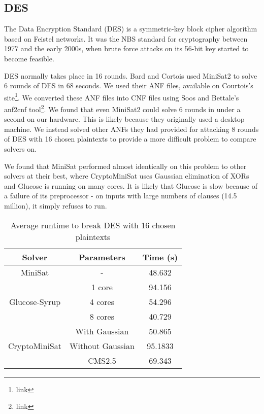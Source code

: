 \subsection{DES}
\label{sec:encoding:des}

The Data Encryption Standard (DES) is a symmetric-key block cipher algorithm based on Feistel networks. It was the NBS standard for cryptography between 1977 and the early 2000s, when brute force attacks on its 56-bit key started to become feasible.\cite{find appropriate citation}


DES normally takes place in 16 rounds. Bard and Cortois\cite{citation} used MiniSat2 to solve 6 rounds of DES in 68 seconds. We used their ANF files, available on Courtois's site\footnote{link}. We converted these ANF files into CNF files using Soos and Bettale's anf2cnf tool\footnote{link}. We found that even MiniSat2 could solve 6 rounds in under a second on our hardware. This is likely because they originally used a desktop machine. We instead solved other ANFs they had provided for attacking 8 rounds of DES with 16 chosen plaintexts to provide a more difficult problem to compare solvers on.

We found that MiniSat performed almost identically on this problem to other solvers at their best, where CryptoMiniSat uses Gaussian elimination of XORs and Glucose is running on many cores. It is likely that Glucose is slow because of a failure of its preprocessor - on inputs with large numbers of clauses (14.5 million), it simply refuses to run. 


\begin{table}[!htbp]
	\centering
	\begin{tabular}{|c|c|c|}
		\hline
		\textbf{Solver} & \textbf{Parameters} & \textbf{Time (s)} \\
		\hline
		MiniSat & - & 48.632 \\
		\hline
		\multirow{3}{*}{Glucose-Syrup} & 1 core & 94.156 \\ \cline{2-3}
		& 4 cores & 54.296 \\ \cline{2-3}
		& 8 cores & 40.729 \\
		\hline
		
		\multirow{3}{*}{CryptoMiniSat} & With Gaussian & 50.865 \\ \cline{2-3} 
		& Without Gaussian & 95.1833 \\ \cline{2-3} 
		& CMS2.5 & 69.343 \\ \cline{2-3} 
		\hline
	\end{tabular}
	
	\caption{Average runtime to break DES with 16 chosen plaintexts}
	\label{table:des:runtime}
\end{table}